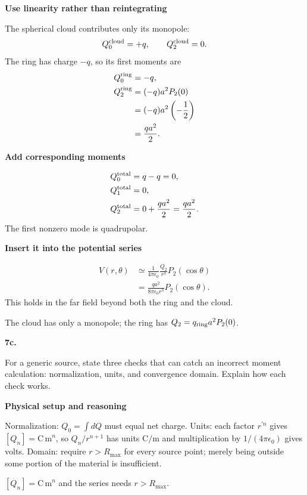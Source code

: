 \documentclass[11pt]{article}
\newcommand{\q}[2]{\par\bigskip\noindent\textbf{\color{navy}#1}\par\smallskip #2\par\medskip}
\newcommand{\stage}[1]{\par\medskip\noindent\textbf{\color{blue}#1}\par\smallskip}
\newcommand{\connect}[1]{\begin{tcolorbox}[colback=blue!4,colframe=blue!45,title=Keep the thread,fonttitle=\bfseries,boxrule=.45pt,breakable]#1\end{tcolorbox}}
\begin{document}
\stage{Use linearity rather than reintegrating}
The spherical cloud contributes only its monopole:
\[Q_0^{\rm cloud}=+q,\qquad Q_2^{\rm cloud}=0.\]
The ring has charge $-q$, so its first moments are
\begin{align*}Q_0^{\rm ring}&=-q,\\Q_2^{\rm ring}&=(-q)a^2P_2(0)\\&=(-q)a^2\left(-\frac12\right)\\&=\frac{qa^2}{2}.\end{align*}
\stage{Add corresponding moments}
\begin{align*}Q_0^{\rm total}&=q-q=0,\\Q_1^{\rm total}&=0,\\Q_2^{\rm total}&=0+\frac{qa^2}{2}=\frac{qa^2}{2}.\end{align*}
The first nonzero mode is quadrupolar.
\stage{Insert it into the potential series}
\begin{align*}V(r,\theta)&\simeq\frac1{4\pi\epsilon_0}\frac{Q_2}{r^3}P_2(\cos\theta)\\&=\boxed{\frac{qa^2}{8\pi\epsilon_0r^3}P_2(\cos\theta)}.\end{align*}
This holds in the far field beyond both the ring and the cloud.
\connect{The cloud has only a monopole; the ring has $Q_2=q_{\rm ring}a^2P_2(0)$.}

\q{7c.}{For a generic source, state three checks that can catch an incorrect moment calculation: normalization, units, and convergence domain. Explain how each check works.}
\stage{Physical setup and reasoning}

Normalization: $Q_0=\int dQ$ must equal net charge. Units: each factor $r^{\prime n}$ gives $[Q_n]=\mathrm{C\,m}^n$, so $Q_n/r^{n+1}$ has units $\mathrm{C/m}$ and multiplication by $1/(4\pi\epsilon_0)$ gives volts. Domain: require $r>R_{\max}$ for every source point; merely being outside some portion of the material is insufficient.
\connect{$[Q_n]=\mathrm{C\,m}^n$ and the series needs $r>R_{\max}$.}
\end{document}
